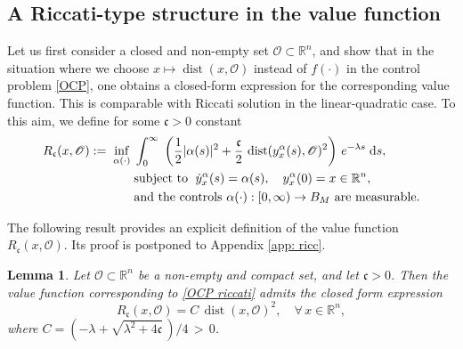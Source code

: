 \documentclass[12pt]{amsart}
\newcommand{\D}[1]{\mbox{\rm #1}}
\newcommand{\dd}{\D{d}}
\numberwithin{equation}{section}
\theoremstyle{plain}
\newtheorem{lemma}[theorem]{Lemma}
\begin{document}
\subsection{A Riccati-type structure in the value function} 

Let us first consider a closed and non-empty set $\mathscr{O}\subset \mathbb{R}^{n}$, and show that in the situation where we choose $x\mapsto \operatorname{dist}(x,\mathscr{O})$ instead of $f(\cdot)$ in the control problem \eqref{OCP}, one obtains a closed-form expression for the corresponding value function. This is comparable with Riccati solution in the linear-quadratic case. To this aim, we define for some $\mathfrak{c}>0$ constant 
\begin{equation}\label{OCP riccati}
\begin{aligned}
    R_{\mathfrak{c}}(x,\mathscr{O}) := \; 
    \inf\limits_{\alpha(\cdot)} \; & \int_{0}^{\infty}\; \left(\frac{1}{2}|\alpha(s)|^{2} + \frac{\mathfrak{c}}{2}\,\operatorname{dist}(y_{x}^{\alpha}(s),\mathscr{O})^{2}\right)\, e^{-\lambda s}\;\dd s,\\
    & \text{subject  to  }\; \dot{y}_{x}^{\alpha}(s) = \alpha(s),\quad y_{x}^{\alpha}(0)=x\in\mathbb{R}^n,\\
    & \text{and the controls } \alpha(\cdot):[0,\infty) \to B_{M} \text{ are measurable}. 
\end{aligned}
\end{equation}




The following result provides an explicit definition of the value function $R_{\mathfrak{c}}(x,\mathscr{O})$. Its proof is postponed to Appendix \ref{app: ricc}.

\begin{lemma}\label{lem: ricc}
Let $\mathscr{O}\subset\mathbb{R}^{n}$ be a non-empty and compact set, and let $\mathfrak{c}>0$. Then the value function corresponding to \eqref{OCP riccati} admits the closed form expression
\begin{equation*}
    R_{\mathfrak{c}}(x,\mathscr{O}) = C\,\operatorname{dist}(x,\mathscr{O})^{2} ,\quad \forall\,x\in\mathbb{R}^{n},
\end{equation*}
where $C = (-\lambda + \sqrt{\lambda^{2} + 4\mathfrak{c}}\,)/4 \,>\,0$.
\end{lemma}
\end{document}
